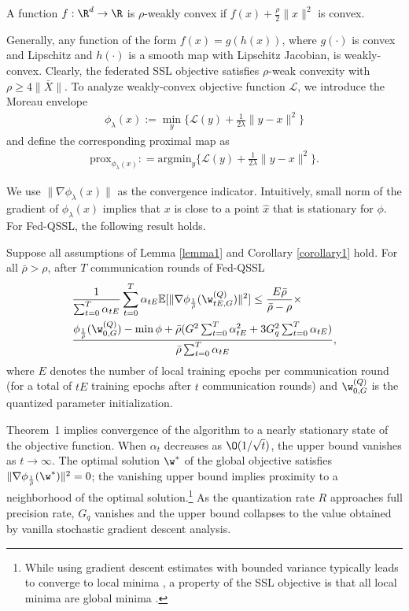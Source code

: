 \begin{definition}
A function $f: \R^d \to \R $ is $\rho$-weakly convex if $f(x) + \frac{\rho}{2}\|x \|^2$ is convex.
\end{definition}
Generally, any function of the form $f(x) = g(h(x))$, where $g(\cdot)$ is convex and Lipschitz and $h(\cdot)$ is a smooth map with Lipschitz Jacobian, is weakly-convex.
Clearly, the federated SSL objective satisfies $\rho$-weak convexity with $\rho \geq 4\|\bar{X} \|$. To analyze weakly-convex objective function $\mathcal{L}$, we introduce the Moreau envelope
\begin{align*}
    \phi_{\lambda}(x) := \min_y \{\mathcal{L}(y) + \frac{1}{2\lambda}\|y-x \|^2 \}
\end{align*}
and define the corresponding proximal map as
\begin{align*}
    \mathrm{prox}_{\phi_{\lambda}(x) } : = \mathrm{argmin}_y  \{\mathcal{L}(y) + \frac{1}{2\lambda}\|y-x \|^2 \}.
\end{align*}

We use $\|\nabla \phi_{\lambda}(x) \|$ as the convergence indicator. Intuitively, small norm of the gradient of $\phi_{\lambda}(x) $ implies that $x$ is close to a point $\hat{x}$ that is stationary for $\phi$. For Fed-QSSL, the following result holds.

\begin{theorem}\label{thm1}
Suppose all assumptions of Lemma \ref{lemma1} and Corollary \ref{corollary1} hold.
For all $\bar{\rho} > \rho$, after $T$ communication rounds of Fed-QSSL
\begin{align*}
    & \frac{1}{\sum_{t=0}^T \alpha_{tE}} \sum_{t=0}^T \alpha_{tE} \mathbb{E} [ \|\nabla \phi_{\frac{1}{\bar{\rho}}} (\w^{(Q)}_{tE, G}) \|^2 ] \leq  \frac{E \bar{\rho}}{\bar{\rho} - \rho} \times \\& \frac{ \phi_{\frac{1}{\bar{\rho}}}(\w^{(Q)}_{0, G}) - \min \phi +  \bar{\rho}(G^2\sum_{t=0}^T \alpha^2_{tE}+3G_q^2\sum_{t=0}^T \alpha_{tE}) }{\bar{\rho}\sum_{t=0}^T \alpha_{tE} },
\end{align*}
where $E$ denotes the number of local training epochs per communication round (for a total of $tE$ training epochs after $t$ communication rounds) and $\w^{(Q)}_{0, G}$ is the quantized parameter initialization. 
\end{theorem}
Theorem~1 implies convergence of the algorithm to a nearly stationary state of the objective function. When $\alpha_t$ decreases as $\O(1/\sqrt{t})$, the upper bound vanishes as $t \to \infty$. The optimal solution $\w^*$ of the global objective satisfies $\| \nabla \phi_{\frac{1}{\bar{\rho}}} (\w^*) \|^2  = 0$; the vanishing upper bound implies proximity to a neighborhood of the optimal solution.{\footnote{While using gradient descent estimates with bounded variance typically leads to converge to local minima \cite{mertikopoulos2020almost}, a property of the SSL objective is that all local minima are global minima \cite{jin2017escape}.}} As the quantization rate $R$ approaches full precision rate, $G_q$ vanishes and the upper bound collapses to the value obtained by vanilla stochastic gradient descent analysis.

